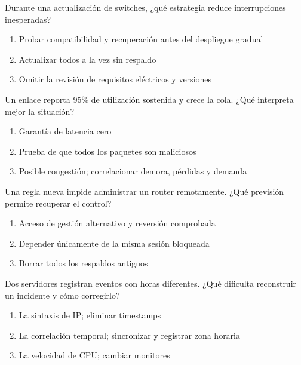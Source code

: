 \noindent\begin{minipage}{\linewidth}\setlength{\parskip}{4pt}\label{q:R-056}
Durante una actualización de switches, ¿qué estrategia reduce interrupciones inesperadas?
\begin{enumerate}[label=\Alph*),nosep]
\item Probar compatibilidad y recuperación antes del despliegue gradual
\item Actualizar todos a la vez sin respaldo
\item Omitir la revisión de requisitos eléctricos y versiones
\end{enumerate}\end{minipage}\par\medskip

\noindent\begin{minipage}{\linewidth}\setlength{\parskip}{4pt}\label{q:R-057}
Un enlace reporta 95\% de utilización sostenida y crece la cola. ¿Qué interpreta mejor la situación?
\begin{enumerate}[label=\Alph*),nosep]
\item Garantía de latencia cero
\item Prueba de que todos los paquetes son maliciosos
\item Posible congestión; correlacionar demora, pérdidas y demanda
\end{enumerate}\end{minipage}\par\medskip

\noindent\begin{minipage}{\linewidth}\setlength{\parskip}{4pt}\label{q:R-058}
Una regla nueva impide administrar un router remotamente. ¿Qué previsión permite recuperar el control?
\begin{enumerate}[label=\Alph*),nosep]
\item Acceso de gestión alternativo y reversión comprobada
\item Depender únicamente de la misma sesión bloqueada
\item Borrar todos los respaldos antiguos
\end{enumerate}\end{minipage}\par\medskip

\noindent\begin{minipage}{\linewidth}\setlength{\parskip}{4pt}\label{q:R-059}
Dos servidores registran eventos con horas diferentes. ¿Qué dificulta reconstruir un incidente y cómo corregirlo?
\begin{enumerate}[label=\Alph*),nosep]
\item La sintaxis de IP; eliminar timestamps
\item La correlación temporal; sincronizar y registrar zona horaria
\item La velocidad de CPU; cambiar monitores
\end{enumerate}\end{minipage}\par\medskip

